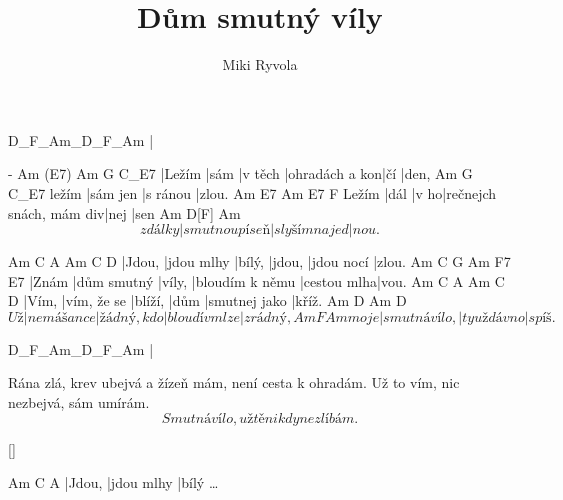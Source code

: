 \documentclass{song}
\title{Dům smutný víly}
\author{Miki Ryvola}
\begin{document}
\strophe
D_F_Am_D_F_Am
|
\endstrophe

\strophe
-      Am   (E7)    Am             G   C_E7
|Ležím |sám |v těch |ohradách a kon|čí |den,
      Am       G        C_E7
ležím |sám jen |s ránou |zlou.
      Am   E7   Am                      E7   F
Ležím |dál |v ho|rečnejch snách, mám div|nej |sen
        Am             D[F]         Am
\[ z dálky |smutnou píseň |slyším najed|nou. \]
\endstrophe

Am     C          A      Am     C          D
|Jdou, |jdou mlhy |bílý, |jdou, |jdou nocí |zlou.
Am    C           G      Am              F7          E7
|Znám |dům smutný |víly, |bloudím k němu |cestou mlha|vou.
Am    C           A       Am   C             D
|Vím, |vím, že se |blíží, |dům |smutnej jako |kříž.
      Am          D           Am             D
\[ Už |nemá šance |žádný, kdo |bloudí v mlze |zrádný,
     Am            F            Am
moje |smutná vílo, |ty už dávno |spíš. \]
\endstrophe

\strophe
D_F_Am_D_F_Am
|
\endstrophe

\strophe*
Rána zlá, krev ubejvá a žízeň mám,
není cesta k ohradám.
Už to vím, nic nezbejvá, sám umírám.
\[ Smutná vílo, už tě nikdy nezlíbám. \]
\endstrophe

\ref{}

\strophe
Am     C          A
|Jdou, |jdou mlhy |bílý \ldots{}
\endstrophe
\end{document}
